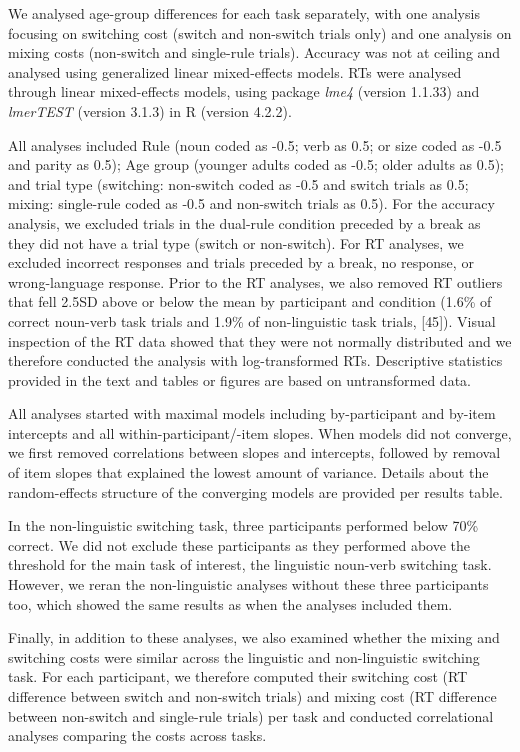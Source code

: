 \documentclass[
]{article}
\begin{document}
We analysed age-group differences for each task separately, with one analysis focusing on switching cost (switch and non-switch trials only) and one analysis on mixing costs (non-switch and single-rule trials). Accuracy was not at ceiling and analysed using generalized linear mixed-effects models. RTs were analysed through linear mixed-effects models, using package \emph{lme4} (version 1.1.33) and \emph{lmerTEST} (version 3.1.3) in R (version 4.2.2).

All analyses included Rule (noun coded as -0.5; verb as 0.5; or size coded as -0.5 and parity as 0.5); Age group (younger adults coded as -0.5; older adults as 0.5); and trial type (switching: non-switch coded as -0.5 and switch trials as 0.5; mixing: single-rule coded as -0.5 and non-switch trials as 0.5). For the accuracy analysis, we excluded trials in the dual-rule condition preceded by a break as they did not have a trial type (switch or non-switch). For RT analyses, we excluded incorrect responses and trials preceded by a break, no response, or wrong-language response. Prior to the RT analyses, we also removed RT outliers that fell 2.5SD above or below the mean by participant and condition (1.6\% of correct noun-verb task trials and 1.9\% of non-linguistic task trials, {[}45{]}). Visual inspection of the RT data showed that they were not normally distributed and we therefore conducted the analysis with log-transformed RTs. Descriptive statistics provided in the text and tables or figures are based on untransformed data.

All analyses started with maximal models including by-participant and by-item intercepts and all within-participant/-item slopes. When models did not converge, we first removed correlations between slopes and intercepts, followed by removal of item slopes that explained the lowest amount of variance. Details about the random-effects structure of the converging models are provided per results table.

In the non-linguistic switching task, three participants performed below 70\% correct. We did not exclude these participants as they performed above the threshold for the main task of interest, the linguistic noun-verb switching task. However, we reran the non-linguistic analyses without these three participants too, which showed the same results as when the analyses included them.

Finally, in addition to these analyses, we also examined whether the mixing and switching costs were similar across the linguistic and non-linguistic switching task. For each participant, we therefore computed their switching cost (RT difference between switch and non-switch trials) and mixing cost (RT difference between non-switch and single-rule trials) per task and conducted correlational analyses comparing the costs across tasks.
\end{document}
